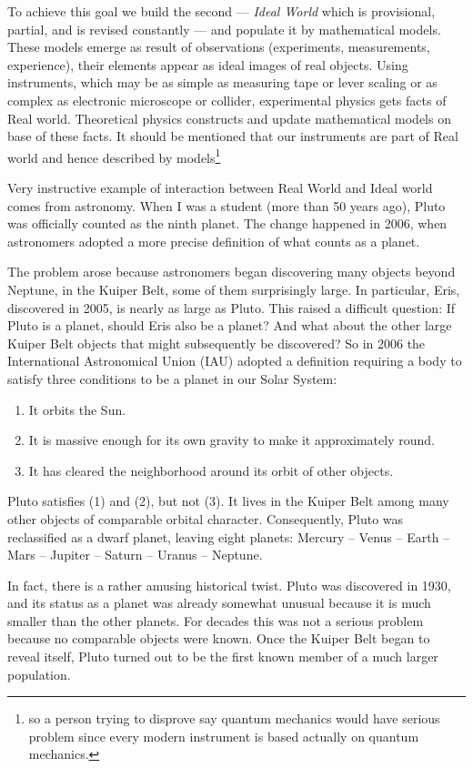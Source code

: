 To achieve this goal we build the second --- \emph{Ideal World} which is
provisional, partial, and  is revised constantly --- and populate it by
mathematical models. These models emerge as result of  observations
(experiments, measurements, experience), their elements appear as ideal images
of real objects. Using instruments, which may be as simple as measuring tape or
lever scaling or as complex as electronic microscope or collider, experimental
physics gets facts of Real world. Theoretical physics constructs and update
mathematical models on base of these facts. It should be mentioned that our
instruments are part of Real world  and hence described by models\footnote{so a
person trying to disprove say quantum mechanics would have serious problem
since every modern instrument is based actually on quantum mechanics.}

Very instructive example of interaction between Real World and Ideal world
comes from astronomy.
When I was a student (more than 50 years ago), Pluto was officially counted as
the ninth planet. The change happened in 2006, when astronomers adopted a more
precise definition of what counts as a planet.
 
The problem arose because astronomers began discovering many objects beyond
Neptune, in the Kuiper Belt, some of them surprisingly large. In particular,
Eris, discovered in 2005, is nearly as large as Pluto.
This raised a difficult question:
If Pluto is a planet, should Eris also be a planet? And what about the other
large Kuiper Belt objects that might subsequently be discovered?
So in 2006 the International Astronomical Union (IAU) adopted a definition
requiring a body to satisfy three conditions to be a planet in our Solar
System:
\begin{enumerate}
   \item It orbits the Sun.
   \item It is massive enough for its own gravity to make it approximately round.
   \item It has cleared the neighborhood around its orbit of other objects.
\end{enumerate}
Pluto satisfies (1) and (2), but not (3). It lives in the Kuiper Belt among
many other objects of comparable orbital character.
Consequently, Pluto was reclassified as a dwarf planet, leaving eight planets:
Mercury – Venus – Earth – Mars – Jupiter – Saturn – Uranus – Neptune.

In fact, there is a rather amusing historical twist. Pluto was discovered in
1930, and its status as a planet was already somewhat unusual because it is
much smaller than the other planets. For decades this was not a serious problem
because no comparable objects were known.
Once the Kuiper Belt began to reveal itself, Pluto turned out to be the first
known member of a much larger population.


